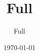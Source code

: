 \documentclass[10pt]{beamer}
\title[Short]{Full}
\author[Short]{Full}
\institute[Short]{Full}
\date{\today}
\begin{document}
\frame[plain]{\titlepage}

\begin{frame}[label=]%
  \frametitle{}
\end{frame}%
\end{document}
